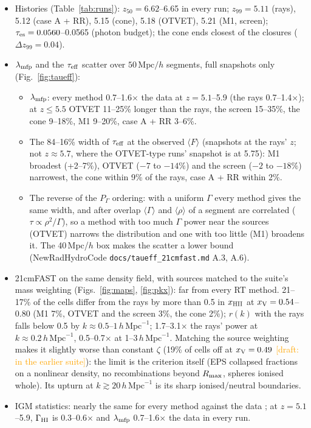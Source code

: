 \documentclass[11pt]{article}
\newcommand{\draft}[1]{\textcolor{orange}{[draft: #1]}}
\newcommand{\hmpc}{\,h\,\mathrm{Mpc}^{-1}}
\newcommand{\mpch}{\,\mathrm{Mpc}/h}
\newcommand{\xv}{x_{\rm V}}
\begin{document}
\begin{itemize}
\item Histories (Table~\ref{tab:runs}): $z_{50}=6.62$--6.65 in every run;
  $z_{99}=5.11$ (rays), 5.12 (case A + RR), 5.15 (cone), 5.18 (OTVET),
  5.21 (M1, screen); $\tau_{\rm es}=0.0560$--0.0565 (photon budget); the
  cone ends closest of the closures ($\Delta z_{99}=0.04$).
\item $\lambda_{\rm mfp}$ and the $\tau_{\rm eff}$ scatter over $50\mpch$
  segments, full snapshots only (Fig.~\ref{fig:taueff}):
  \begin{itemize}
  \item $\lambda_{\rm mfp}$: every method 0.7--1.6$\times$ the data at
    $z=5.1$--5.9 (the rays 0.7--1.4$\times$); at $z\le5.5$ OTVET 11--25\%
    longer than the rays, the screen 15--35\%, the cone 9--18\%, M1
    9--20\%, case A + RR 3--6\%.
  \item The 84--16\% width of $\tau_{\rm eff}$ at the observed $\langle
    F\rangle$ (snapshots at the rays' $z$; not $z\approx5.7$, where the
    OTVET-type runs' snapshot is at 5.75): M1 broadest (+2--7\%), OTVET
    ($-7$ to $-14\%$) and the screen ($-2$ to $-18\%$) narrowest, the cone
    within 9\% of the rays, case A + RR within 2\%.
  \item The reverse of the $P_\Gamma$ ordering: with a uniform $\Gamma$
    every method gives the same width, and after overlap $\langle\Gamma
    \rangle$ and $\langle\rho\rangle$ of a segment are correlated
    ($\tau\propto\rho^2/\Gamma$), so a method with too much $\Gamma$ power
    near the sources (OTVET) narrows the distribution and one with
    too little (M1) broadens it. The 40\,Mpc/$h$ box makes the scatter a
    lower bound (NewRadHydroCode \texttt{docs/taueff\_21cmfast.md} A.3, A.6).
  \end{itemize}
\item 21cmFAST on the same density field, with sources matched to the
  suite's mass weighting (Figs.~\ref{fig:maps}, \ref{fig:pkx}): far
  from every RT method. 21--17\% of the cells differ from the rays by more
  than 0.5 in $x_{\rm HII}$ at $\xv=0.54$--0.80 (M1 7\%, OTVET and the
  screen 3\%, the cone 2\%); $r(k)$ with the rays falls below 0.5 by
  $k\approx0.5$--$1\hmpc$; 1.7--3.1$\times$ the rays' power at
  $k\approx0.2\hmpc$, 0.5--0.7$\times$ at 1--3$\hmpc$. Matching the source
  weighting makes it slightly worse than constant $\zeta$ (19\% of cells
  off at $\xv=0.49$ \draft{in the earlier suite}): the limit is the criterion itself (EPS collapsed
  fractions on a nonlinear density, no recombinations beyond
  $R_{\rm max}$, spheres ionised whole). Its upturn at $k\gtrsim20\hmpc$ is
  its sharp ionised/neutral boundaries.
  \citep{mesinger11,murray20}
\item IGM statistics: nearly the same for every method against the data
  \citep{gaikwad23,becker21,zhu23,bosman22}; at $z=5.1$--5.9,
  $\Gamma_{\rm HI}$ is 0.3--0.6$\times$ and $\lambda_{\rm mfp}$
  0.7--1.6$\times$ the data in every run.
\end{itemize}
\end{document}
